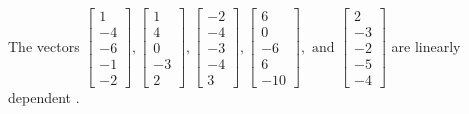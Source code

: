 \begin{exercise}
\begin{exerciseStatement}
  \end{exerciseStatement}
  \begin{exerciseAnswer}
   The vectors \(\left[\begin{array}{r}
1 \\
-4 \\
-6 \\
-1 \\
-2
\end{array}\right] , \left[\begin{array}{r}
1 \\
4 \\
0 \\
-3 \\
2
\end{array}\right] , \left[\begin{array}{r}
-2 \\
-4 \\
-3 \\
-4 \\
3
\end{array}\right] , \left[\begin{array}{r}
6 \\
0 \\
-6 \\
6 \\
-10
\end{array}\right] , \text{ and } \left[\begin{array}{r}
2 \\
-3 \\
-2 \\
-5 \\
-4
\end{array}\right]\) are 
  	 linearly dependent  .
  


  \end{exerciseAnswer}
\end{exercise}